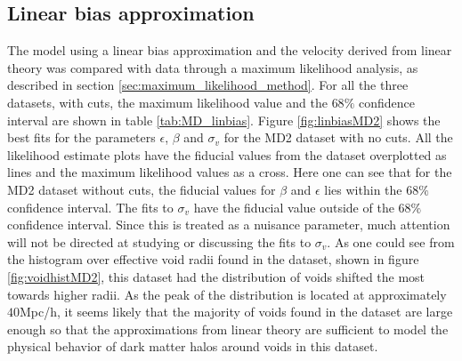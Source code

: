 \subsection{Linear bias approximation}
The model using a linear bias approximation and the velocity derived from linear theory was compared with data through a maximum likelihood analysis, as described in section \ref{sec:maximum_likelihood_method}. For all the three datasets, with cuts, the maximum likelihood value and the $68\%$ confidence interval are shown in table \ref{tab:MD_linbias}. Figure \ref{fig:linbiasMD2} shows the best fits for the parameters $\epsilon$, $\beta$ and $\sigma_v$ for the MD2 dataset with no cuts. All the likelihood estimate plots have the fiducial values from the dataset overplotted as lines and the maximum likelihood values as a cross. Here one can see that for the MD2 dataset without cuts, the fiducial values for $\beta$ and $\epsilon$ lies within the $68\%$ confidence interval. The fits to $\sigma_v$ have the fiducial value outside of the $68\%$ confidence interval. Since this is treated as a nuisance parameter, much attention will not be directed at studying or discussing the fits to $\sigma_v$. As one could see from the histogram over effective void radii found in the dataset, shown in figure \ref{fig:voidhistMD2}, this dataset had the distribution of voids shifted the most towards higher radii. As the peak of the distribution is located at approximately $40$Mpc/h, it seems likely that the majority of voids found in the dataset are large enough so that the approximations from linear theory are sufficient to model the physical behavior of dark matter halos around voids in this dataset.\\\indent
